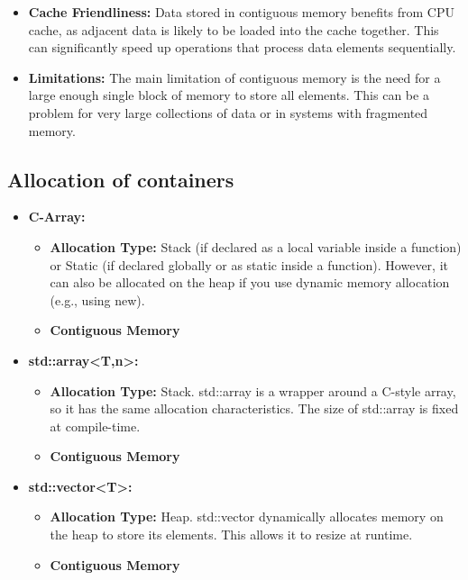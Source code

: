 \documentclass{report}
\begin{document}
\begin{concept}
\begin{concept}
\begin{itemize}
            \item \textbf{Cache Friendliness:} Data stored in contiguous memory benefits from CPU cache, as adjacent data is likely to be loaded into the cache together. This can significantly speed up operations that process data elements sequentially.
            \item \textbf{Limitations:} The main limitation of contiguous memory is the need for a large enough single block of memory to store all elements. This can be a problem for very large collections of data or in systems with fragmented memory.
       \end{itemize}
    \end{concept}
    

    \pagebreak
    \bigbreak \noindent 
    \subsection{Allocation of containers}
    \begin{itemize}
        \item \textbf{C-Array:}
        \begin{itemize}
            \item \textbf{Allocation Type:} Stack (if declared as a local variable inside a function) or Static (if declared globally or as static inside a function). However, it can also be allocated on the heap if you use dynamic memory allocation (e.g., using new).
            \item \textbf{Contiguous Memory}
        \end{itemize}
        \item \textbf{std::array<T,n>:}
        \begin{itemize}
            \item \textbf{Allocation Type:} Stack. std::array is a wrapper around a C-style array, so it has the same allocation characteristics. The size of std::array is fixed at compile-time.
            \item \textbf{Contiguous Memory}
        \end{itemize}
        \item \textbf{std::vector<T>:}
        \begin{itemize}
            \item \textbf{Allocation Type:} Heap. std::vector dynamically allocates memory on the heap to store its elements. This allows it to resize at runtime.
            \item \textbf{Contiguous Memory}

\end{itemize}
\end{itemize}
\end{concept}
\end{document}
